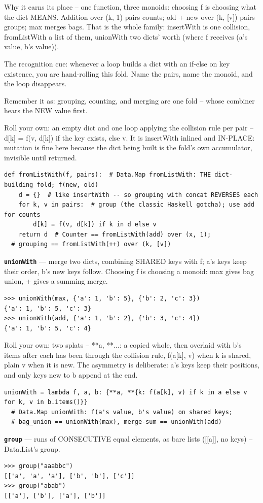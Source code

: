 \documentclass[10pt,letterpaper]{article}
\begin{document}
Why it earns its place -- one function, three monoids: choosing f is choosing what the dict MEANS. Addition over (k, 1) pairs counts; old + new over (k, [v]) pairs groups; max merges bags. That is the whole family: insertWith is one collision, fromListWith a list of them, unionWith two dicts' worth (where f receives (a's value, b's value)).


The recognition cue: whenever a loop builds a dict with an if-else on key existence, you are hand-rolling this fold. Name the pairs, name the monoid, and the loop disappears.


Remember it as: grouping, counting, and merging are one fold -- whose combiner hears the NEW value first.


Roll your own: an empty dict and one loop applying the collision rule per pair -- d[k] = f(v, d[k]) if the key exists, else v. It is insertWith inlined and IN-PLACE: mutation is fine here because the dict being built is the fold's own accumulator, invisible until returned.

\begin{lstlisting}[style=ex]
def fromListWith(f, pairs):  # Data.Map fromListWith: THE dict-building fold; f(new, old)
    d = {}  # like insertWith -- so grouping with concat REVERSES each
    for k, v in pairs:  # group (the classic Haskell gotcha); use add for counts
        d[k] = f(v, d[k]) if k in d else v
    return d  # Counter == fromListWith(add) over (x, 1);
  # grouping == fromListWith(++) over (k, [v])
\end{lstlisting}
\textbf{\texttt{unionWith}} --- merge two dicts, combining SHARED keys with f; a's keys keep their order, b's new keys follow. Choosing f is choosing a monoid: max gives bag union, + gives a summing merge.
\begin{lstlisting}[style=ex]
>>> unionWith(max, {'a': 1, 'b': 5}, {'b': 2, 'c': 3})
{'a': 1, 'b': 5, 'c': 3}
>>> unionWith(add, {'a': 1, 'b': 2}, {'b': 3, 'c': 4})
{'a': 1, 'b': 5, 'c': 4}
\end{lstlisting}

Roll your own: two splats -- {**a, **{...}}: a copied whole, then overlaid with b's items after each has been through the collision rule, f(a[k], v) when k is shared, plain v when it is new. The asymmetry is deliberate: a's keys keep their positions, and only keys new to b append at the end.

\begin{lstlisting}[style=ex]
unionWith = lambda f, a, b: {**a, **{k: f(a[k], v) if k in a else v for k, v in b.items()}}
  # Data.Map unionWith: f(a's value, b's value) on shared keys;
  # bag_union == unionWith(max), merge-sum == unionWith(add)
\end{lstlisting}
\textbf{\texttt{group}} --- runs of CONSECUTIVE equal elements, as bare lists ([[a]], no keys) -- Data.List's group.
\begin{lstlisting}[style=ex]
>>> group("aaabbc")
[['a', 'a', 'a'], ['b', 'b'], ['c']]
>>> group("abab")
[['a'], ['b'], ['a'], ['b']]
\end{lstlisting}
\end{document}
